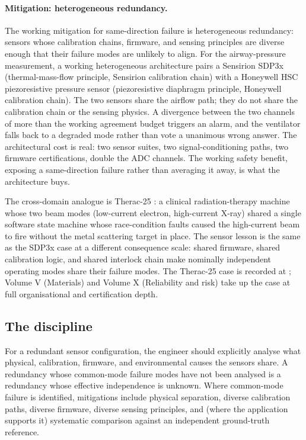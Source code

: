 \paragraph{Mitigation: heterogeneous redundancy.}
The working mitigation for same-direction failure is heterogeneous
redundancy: sensors whose calibration chains, firmware, and
sensing principles are diverse enough that their failure modes are
unlikely to align. For the airway-pressure measurement, a working
heterogeneous architecture pairs a Sensirion SDP3x
(thermal-mass-flow principle, Sensirion calibration chain) with a
Honeywell HSC piezoresistive pressure sensor
\cite{text:ch05t3-honeywell-hsc-datasheet} (piezoresistive
diaphragm principle, Honeywell calibration chain). The two sensors
share the airflow path; they do not share the calibration chain or
the sensing physics. A divergence between the two channels of
more than the working agreement budget triggers an alarm, and the
ventilator falls back to a degraded mode rather than vote a
unanimous wrong answer. The architectural cost is real: two sensor
suites, two signal-conditioning paths, two firmware certifications,
double the ADC channels. The working safety benefit, exposing a
same-direction failure rather than averaging it away, is what the
architecture buys.

The cross-domain analogue is Therac-25
\cite{paper:leveson-turner1993}: a clinical radiation-therapy
machine whose two beam modes (low-current electron, high-current
X-ray) shared a single software state machine whose race-condition
faults caused the high-current beam to fire without the metal
scattering target in place. The sensor lesson is the same as the
SDP3x case at a different consequence scale: shared firmware,
shared calibration logic, and shared interlock chain make
nominally independent operating modes share their failure modes.
The Therac-25 case is recorded at
; Volume
V (Materials) and Volume X (Reliability and risk) take up the
case at full organisational and certification depth.

\subsection{The discipline}

\begin{principle}
For a redundant sensor configuration, the engineer should
explicitly analyse what physical, calibration, firmware, and
environmental causes the sensors share. A redundancy whose
common-mode failure modes have not been analysed is a redundancy
whose effective independence is unknown. Where common-mode failure
is identified, mitigations include physical separation, diverse
calibration paths, diverse firmware, diverse sensing principles,
and (where the application supports it) systematic comparison
against an independent ground-truth reference.
\end{principle}

